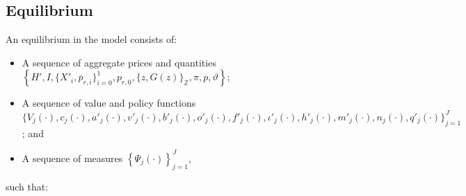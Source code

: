 \documentclass[parskip=full]{article}
\begin{document}
\subsection{Equilibrium}
An equilibrium in the model consists of: 
\begin{itemize}
    \item A sequence of aggregate prices and quantities
    $\left\{H',I,\{X'_{i},\overline{p}_{r,i}\}^{1}_{i=0},p_{r,0},\{z,G(z)\}_\mathbb{Z},\pi,p,\vartheta\right\}$;
    \item A sequence of value and policy functions
    $\biggl\{V_{j}(\cdot),c_{j}(\cdot),a'_{j}(\cdot),v'_{j}(\cdot),b'_{j}(\cdot),o'_{j}(\cdot),f'_{j}(\cdot),\iota'_{j}(\cdot),h'_{j}(\cdot),m'_{j}(\cdot),n_{j}(\cdot),q'_{j}(\cdot)\biggl\}_{j=1}^J$; and
    \item A sequence of measures 
     $\left\{\Psi_{j}(\cdot)\right\}_{j=1}^J$,
\end{itemize}
\noindent such that:
\end{document}
